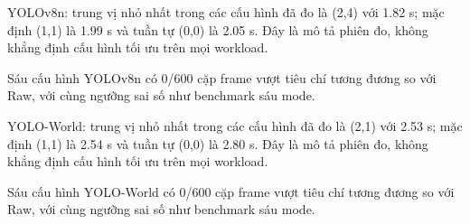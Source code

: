 YOLOv8n: trung vị nhỏ nhất trong các cấu hình đã đo là (2,4) với 1.82 s; mặc định (1,1) là 1.99 s và tuần tự (0,0) là 2.05 s. Đây là mô tả phiên đo, không khẳng định cấu hình tối ưu trên mọi workload.

Sáu cấu hình YOLOv8n có 0/600 cặp frame vượt tiêu chí tương đương so với Raw, với cùng ngưỡng sai số như benchmark sáu mode.

YOLO-World: trung vị nhỏ nhất trong các cấu hình đã đo là (2,1) với 2.53 s; mặc định (1,1) là 2.54 s và tuần tự (0,0) là 2.80 s. Đây là mô tả phiên đo, không khẳng định cấu hình tối ưu trên mọi workload.

Sáu cấu hình YOLO-World có 0/600 cặp frame vượt tiêu chí tương đương so với Raw, với cùng ngưỡng sai số như benchmark sáu mode.
